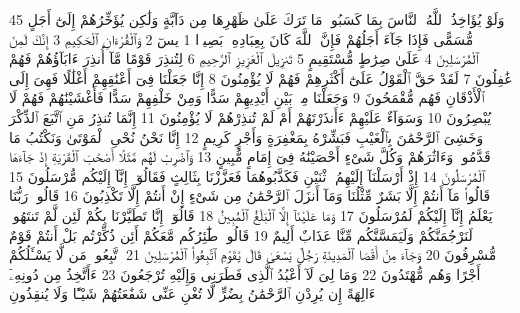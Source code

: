 {\tiny\colorbox{cl_aya}{45}} وَلَوْ يُؤَاخِذُ ٱللَّهُ ٱلنَّاسَ بِمَا كَسَبُوا۟ مَا تَرَكَ عَلَىٰ ظَهْرِهَا مِن دَآبَّةٍ وَلَٰكِن يُؤَخِّرُهُمْ إِلَىٰٓ أَجَلٍ مُّسَمًّى فَإِذَا جَآءَ أَجَلُهُمْ فَإِنَّ ٱللَّهَ كَانَ بِعِبَادِهِۦ بَصِيرًۢا
{\tiny\colorbox{cl_aya}{1}} يسٓ
{\tiny\colorbox{cl_aya}{2}} وَٱلْقُرْءَانِ ٱلْحَكِيمِ
{\tiny\colorbox{cl_aya}{3}} إِنَّكَ لَمِنَ ٱلْمُرْسَلِينَ
{\tiny\colorbox{cl_aya}{4}} عَلَىٰ صِرَٰطٍ مُّسْتَقِيمٍ
{\tiny\colorbox{cl_aya}{5}} تَنزِيلَ ٱلْعَزِيزِ ٱلرَّحِيمِ
{\tiny\colorbox{cl_aya}{6}} لِتُنذِرَ قَوْمًا مَّآ أُنذِرَ ءَابَآؤُهُمْ فَهُمْ غَٰفِلُونَ
{\tiny\colorbox{cl_aya}{7}} لَقَدْ حَقَّ ٱلْقَوْلُ عَلَىٰٓ أَكْثَرِهِمْ فَهُمْ لَا يُؤْمِنُونَ
{\tiny\colorbox{cl_aya}{8}} إِنَّا جَعَلْنَا فِىٓ أَعْنَٰقِهِمْ أَغْلَٰلًا فَهِىَ إِلَى ٱلْأَذْقَانِ فَهُم مُّقْمَحُونَ
{\tiny\colorbox{cl_aya}{9}} وَجَعَلْنَا مِنۢ بَيْنِ أَيْدِيهِمْ سَدًّا وَمِنْ خَلْفِهِمْ سَدًّا فَأَغْشَيْنَٰهُمْ فَهُمْ لَا يُبْصِرُونَ
{\tiny\colorbox{cl_aya}{10}} وَسَوَآءٌ عَلَيْهِمْ ءَأَنذَرْتَهُمْ أَمْ لَمْ تُنذِرْهُمْ لَا يُؤْمِنُونَ
{\tiny\colorbox{cl_aya}{11}} إِنَّمَا تُنذِرُ مَنِ ٱتَّبَعَ ٱلذِّكْرَ وَخَشِىَ ٱلرَّحْمَٰنَ بِٱلْغَيْبِ فَبَشِّرْهُ بِمَغْفِرَةٍ وَأَجْرٍ كَرِيمٍ
{\tiny\colorbox{cl_aya}{12}} إِنَّا نَحْنُ نُحْىِ ٱلْمَوْتَىٰ وَنَكْتُبُ مَا قَدَّمُوا۟ وَءَاثَٰرَهُمْ وَكُلَّ شَىْءٍ أَحْصَيْنَٰهُ فِىٓ إِمَامٍ مُّبِينٍ
{\tiny\colorbox{cl_aya}{13}} وَٱضْرِبْ لَهُم مَّثَلًا أَصْحَٰبَ ٱلْقَرْيَةِ إِذْ جَآءَهَا ٱلْمُرْسَلُونَ
{\tiny\colorbox{cl_aya}{14}} إِذْ أَرْسَلْنَآ إِلَيْهِمُ ٱثْنَيْنِ فَكَذَّبُوهُمَا فَعَزَّزْنَا بِثَالِثٍ فَقَالُوٓا۟ إِنَّآ إِلَيْكُم مُّرْسَلُونَ
{\tiny\colorbox{cl_aya}{15}} قَالُوا۟ مَآ أَنتُمْ إِلَّا بَشَرٌ مِّثْلُنَا وَمَآ أَنزَلَ ٱلرَّحْمَٰنُ مِن شَىْءٍ إِنْ أَنتُمْ إِلَّا تَكْذِبُونَ
{\tiny\colorbox{cl_aya}{16}} قَالُوا۟ رَبُّنَا يَعْلَمُ إِنَّآ إِلَيْكُمْ لَمُرْسَلُونَ
{\tiny\colorbox{cl_aya}{17}} وَمَا عَلَيْنَآ إِلَّا ٱلْبَلَٰغُ ٱلْمُبِينُ
{\tiny\colorbox{cl_aya}{18}} قَالُوٓا۟ إِنَّا تَطَيَّرْنَا بِكُمْ لَئِن لَّمْ تَنتَهُوا۟ لَنَرْجُمَنَّكُمْ وَلَيَمَسَّنَّكُم مِّنَّا عَذَابٌ أَلِيمٌ
{\tiny\colorbox{cl_aya}{19}} قَالُوا۟ طَٰٓئِرُكُم مَّعَكُمْ أَئِن ذُكِّرْتُم بَلْ أَنتُمْ قَوْمٌ مُّسْرِفُونَ
{\tiny\colorbox{cl_aya}{20}} وَجَآءَ مِنْ أَقْصَا ٱلْمَدِينَةِ رَجُلٌ يَسْعَىٰ قَالَ يَٰقَوْمِ ٱتَّبِعُوا۟ ٱلْمُرْسَلِينَ
{\tiny\colorbox{cl_aya}{21}} ٱتَّبِعُوا۟ مَن لَّا يَسْـَٔلُكُمْ أَجْرًا وَهُم مُّهْتَدُونَ
{\tiny\colorbox{cl_aya}{22}} وَمَا لِىَ لَآ أَعْبُدُ ٱلَّذِى فَطَرَنِى وَإِلَيْهِ تُرْجَعُونَ
{\tiny\colorbox{cl_aya}{23}} ءَأَتَّخِذُ مِن دُونِهِۦٓ ءَالِهَةً إِن يُرِدْنِ ٱلرَّحْمَٰنُ بِضُرٍّ لَّا تُغْنِ عَنِّى شَفَٰعَتُهُمْ شَيْـًٔا وَلَا يُنقِذُونِ
